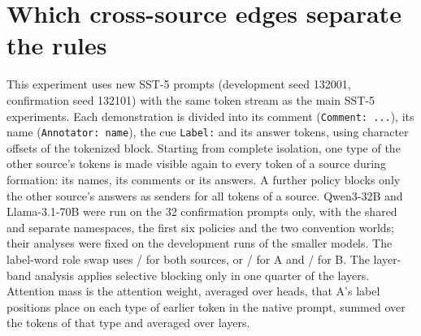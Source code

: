 \begin{table}[!ht]
\centering\small
\setlength{\tabcolsep}{3pt}
\caption{Accuracy (\%) of the coherent combinations 00 / 11 with shared words and conflicting conventions.}
\label{tab:app-joint}
\end{table}

\section{Which cross-source edges separate the rules}
\label{app:edges}

This experiment uses new SST-5 prompts (development seed 132001, confirmation seed 132101) with the same token stream as the main SST-5 experiments.
Each demonstration is divided into its comment (\texttt{Comment: ...}), its name (\texttt{Annotator: name}), the cue \texttt{Label:} and its answer tokens, using character offsets of the tokenized block.
Starting from complete isolation, one type of the other source's tokens is made visible again to every token of a source during formation: its names, its comments or its answers.
A further policy blocks only the other source's answers as senders for all tokens of a source.
Qwen3-32B and Llama-3.1-70B were run on the 32 confirmation prompts only, with the shared and separate namespaces, the first six policies and the two convention worlds; their analyses were fixed on the development runs of the smaller models.
The label-word role swap uses / for both sources, or / for A and / for B.
The layer-band analysis applies selective blocking only in one quarter of the layers.
Attention mass is the attention weight, averaged over heads, that A's label positions place on each type of earlier token in the native prompt, summed over the tokens of that type and averaged over layers.

